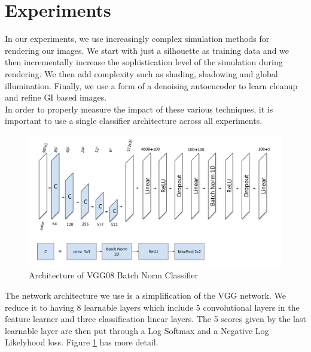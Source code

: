 \documentclass[10pt,twocolumn,letterpaper]{article}
\begin{document}
\section{Experiments}
In our experiments, we use increasingly complex simulation methods for rendering our images.  We start with just a silhouette as training data and we then incrementally increase the sophistication level of the simulation during rendering.  We then add complexity such as shading, shadowing and global illumination. Finally, we use a form of a denoising autoencoder to learn cleanup  and refine GI based images.\\ 

In order to properly measure the impact of these various techniques, it is important to use a single classifier architecture across all experiments.

\begin{figure}[h!]
\centering
\includegraphics[width=1.0\columnwidth]{./assets/vgg08_diagram.pdf}
\caption{Architecture of VGG08 Batch Norm Classifier}
\label{fig:VGG_DAIGRAM}
\end{figure}
The network architecture we use is a simplification of the VGG network\cite{DBLP:journals/corr/SimonyanZ14a}.  We reduce it to having 8 learnable layers which include 5 convolutional layers in the feature learner and three classification linear layers.   
The 5 scores given by the last learnable layer are then put through a Log Softmax and a Negative Log Likelyhood loss. %
Figure \ref{fig:VGG_DAIGRAM} has more detail.\\
\end{document}
